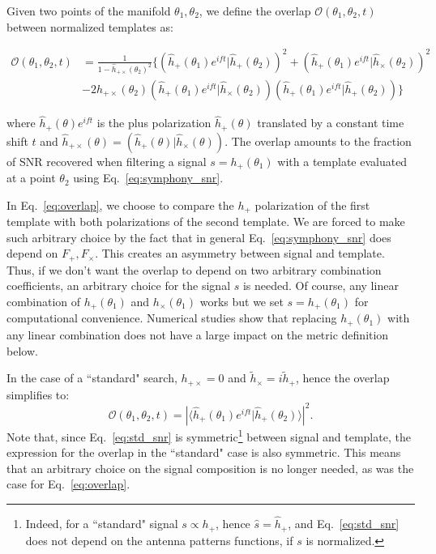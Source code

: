 \documentclass[twocolumn,showpacs,preprintnumbers,nofootinbib,prd,
superscriptaddress,10pt]{revtex4-2}
\newcommand{\scalar}[2]{\langle #1|#2 \rangle}
\newcommand{\rescalar}[2]{( #1 |#2 )}
\newcommand{\rescalarwide}[2]{\left( #1 \lvert #2 \right)}
\begin{document}
Given two points of the manifold $\theta_1,\theta_2$, we define the overlap $\mathcal{O}(\theta_1,\theta_2, t)$ between normalized templates as:
\begin{widetext}
	\begin{align}\label{eq:overlap}
		\mathcal{O}(\theta_1,\theta_2, t) &= \frac{1}{1- \hat{h}_{+\times}(\theta_2)^2} 
		\biggl\{ \rescalarwide{\hat{h}_+(\theta_1)e^{i ft}}{\hat{h}_+(\theta_2)}^2 + \rescalarwide{\hat{h}_+(\theta_1)e^{i ft}}{\hat{h}_\times(\theta_2)}^2 \nonumber \\
		& -2h_{+\times}(\theta_2)\rescalarwide{\hat{h}_+(\theta_1)e^{i ft}}{\hat{h}_\times(\theta_2)}\rescalarwide{\hat{h}_+(\theta_1)e^{i ft}}{\hat{h}_+(\theta_2)} \biggl\}
	\end{align}
\end{widetext}
where $\hat{h}_+(\theta)e^{i ft}$ is the plus polarization $\hat{h}_+(\theta)$ translated by a constant time shift $t$ and $\hat{h}_{+\times}(\theta) = \rescalar{\hat{h}_+(\theta)}{\hat{h}_\times(\theta)}$.
The overlap amounts to the fraction of SNR recovered when filtering a signal $s=h_+(\theta_1)$ with a template evaluated at a point $\theta_2$ using Eq.~\eqref{eq:symphony_snr}.

In Eq.~\eqref{eq:overlap}, we choose to compare the $h_+$ polarization of the first template with both polarizations of the second template. We are forced to make such arbitrary choice by the fact that in general Eq.~\eqref{eq:symphony_snr} does depend on $F_+, F_\times$.
This creates an asymmetry between signal and template.
Thus, if we don't want the overlap to depend on two arbitrary combination coefficients, an arbitrary choice for the signal $s$ is needed.
Of course, any linear combination of $h_+(\theta_1)$ and $h_\times(\theta_1)$ works but we set $s = h_+(\theta_1)$ for computational convenience. Numerical studies show that replacing $h_+(\theta_1)$ with any linear combination does not have a large impact on the metric definition below.

In the case of a ``standard" search, $h_{+\times} = 0$ and $\tilde{h}_\times = i \tilde{h}_+$, hence the overlap simplifies to:
\begin{equation}\label{eq:overlap_NP}
\mathcal{O}(\theta_1,\theta_2, t) = \left|\scalar{\hat{h}_+(\theta_1)e^{i ft}}{\hat{h}_+(\theta_2)} \right|^2.
\end{equation}
Note that, since Eq.~\eqref{eq:std_snr} is symmetric\footnote{Indeed, for a ``standard" signal $s \propto h_+$, hence $\hat{s} = \hat{h}_+$, and Eq.~\eqref{eq:std_snr} does not depend on the antenna patterns functions, if $s$ is normalized.} between signal and template, the expression for the overlap in the ``standard" case is also symmetric. This means that an arbitrary choice on the signal composition is no longer needed, as was the case for Eq.~\eqref{eq:overlap}.
\end{document}
